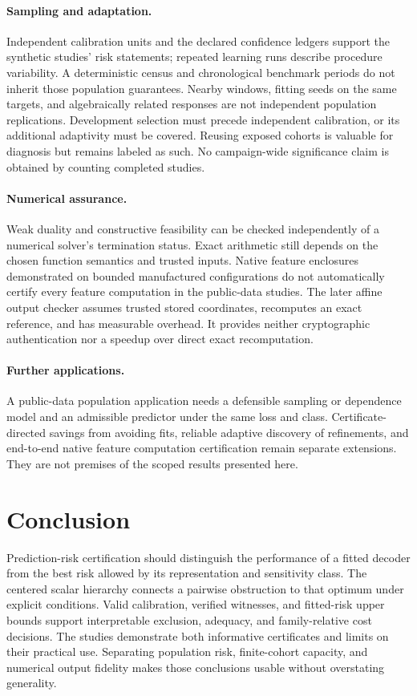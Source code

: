 \paragraph{Sampling and adaptation.}
Independent calibration units and the declared confidence ledgers support the synthetic studies' risk statements; repeated learning runs describe procedure variability. A deterministic census and chronological benchmark periods do not inherit those population guarantees. Nearby windows, fitting seeds on the same targets, and algebraically related responses are not independent population replications. Development selection must precede independent calibration, or its additional adaptivity must be covered. Reusing exposed cohorts is valuable for diagnosis but remains labeled as such. No campaign-wide significance claim is obtained by counting completed studies.

\paragraph{Numerical assurance.}
Weak duality and constructive feasibility can be checked independently of a numerical solver's termination status. Exact arithmetic still depends on the chosen function semantics and trusted inputs. Native feature enclosures demonstrated on bounded manufactured configurations do not automatically certify every feature computation in the public-data studies. The later affine output checker assumes trusted stored coordinates, recomputes an exact reference, and has measurable overhead. It provides neither cryptographic authentication nor a speedup over direct exact recomputation.

\paragraph{Further applications.}
A public-data population application needs a defensible sampling or dependence model and an admissible predictor under the same loss and class. Certificate-directed savings from avoiding fits, reliable adaptive discovery of refinements, and end-to-end native feature computation certification remain separate extensions. They are not premises of the scoped results presented here.

\section{Conclusion}
Prediction-risk certification should distinguish the performance of a fitted decoder from the best risk allowed by its representation and sensitivity class. The centered scalar hierarchy connects a pairwise obstruction to that optimum under explicit conditions. Valid calibration, verified witnesses, and fitted-risk upper bounds support interpretable exclusion, adequacy, and family-relative cost decisions. The studies demonstrate both informative certificates and limits on their practical use. Separating population risk, finite-cohort capacity, and numerical output fidelity makes those conclusions usable without overstating generality.

